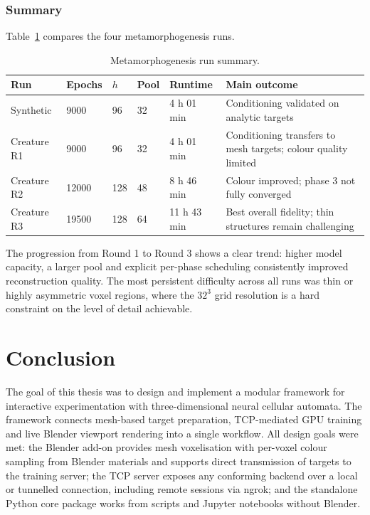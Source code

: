 \subsection{Summary}

Table~\ref{tab:exp-meta-summary} compares the four metamorphogenesis runs.

\begin{table}[htbp]
    \centering
    \small
    {\setlength{\tabcolsep}{3pt}
    \begin{tabular}{@{}p{}p{}p{}
                    p{}p{}p{}@{}}
        \hline
        \textbf{Run} & \textbf{Epochs} & \textbf{$h$} & \textbf{Pool} &
        \textbf{Runtime} & \textbf{Main outcome}\\
        \hline
        Synthetic    & 9000  & 96  & 32 & 4 h 01 min  &
            Conditioning validated on analytic targets\\
        Creature R1  & 9000  & 96  & 32 & 4 h 01 min  &
            Conditioning transfers to mesh targets; colour quality limited\\
        Creature R2  & 12000 & 128 & 48 & 8 h 46 min  &
            Colour improved; phase 3 not fully converged\\
        Creature R3  & 19500 & 128 & 64 & 11 h 43 min &
            Best overall fidelity; thin structures remain challenging\\
        \hline
    \end{tabular}}
    \caption{Metamorphogenesis run summary.}
    \label{tab:exp-meta-summary}
\end{table}

The progression from Round 1 to Round 3 shows a clear trend: higher model
capacity, a larger pool and explicit per-phase scheduling consistently
improved reconstruction quality. The most persistent difficulty across all
runs was thin or highly asymmetric voxel regions, where the $32^3$ grid
resolution is a hard constraint on the level of detail achievable.

\chapter{Conclusion}
\label{zaver}

The goal of this thesis was to design and implement a modular framework for
interactive experimentation with three-dimensional neural cellular automata.
The framework connects mesh-based target preparation, TCP-mediated GPU
training and live Blender viewport rendering into a single workflow. All
design goals were met: the Blender add-on provides mesh voxelisation with
per-voxel colour sampling from Blender materials and supports direct
transmission of targets to the training server; the TCP server exposes any
conforming backend over a local or tunnelled connection, including remote
sessions via ngrok; and the standalone Python core package works from scripts
and Jupyter notebooks without Blender.

